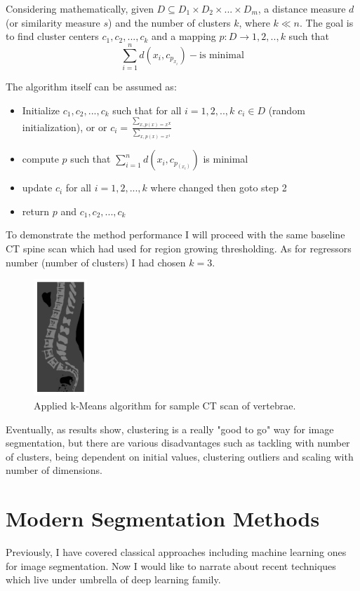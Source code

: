 Considering mathematically, given $D \subseteq D_1 \times D_2 \times ... \times D_m$, a distance measure $d$ (or similarity measure $s$) and the number of clusters $k$, where $k \ll n$. The goal is to find cluster centers $c_1, c_2, ..., c_k$ and a mapping $p: D \rightarrow {1, 2, .., k} $ such that \[ \sum_{i=1}^{n} d(x_i, c_p_{x_i}) - \text{is minimal}\]

The algorithm itself can be assumed as:
\begin{itemize}
    \item Initialize $c_1, c_2, ..., c_k$ such that for all $i = {1, 2, .., k}$
    \subitem $c_i \in D$ (random initialization), or
    \subitem or $c_i = \frac{\sum_{x, p(x) = x^X}}{\sum_{x, p(x) = x^1}}$
    \item compute $p$ such that
    \subitem $\sum_{i=1}^n d(x_i, c_p_(x_i))$ is minimal
    \item update $c_i$ for all $i = {1,2, ..., k}$ where changed then goto step 2
    \item return $p$ and $c_1, c_2, ..., c_k$
\end{itemize}
    

To demonstrate the method performance I will proceed with the same baseline CT spine scan which had used for region growing thresholding. As for regressors number (number of clusters) I had chosen $k=3$.  

\begin{figure}[h]
    \centering \includegraphics[width=2cm]{images/sample_vertebrae_kmeans.png}
    \caption {Applied k-Means algorithm for sample CT scan of vertebrae.}
\end{figure}

Eventually, as results show, clustering is a really "good to go" way for image segmentation, but there are various disadvantages such as tackling with number of clusters, being dependent on initial values, clustering outliers and scaling with number of dimensions.

\section{Modern Segmentation Methods}
Previously, I have covered classical approaches including machine learning ones for image segmentation. Now I would like to narrate about recent techniques which live under umbrella of deep learning family.        

